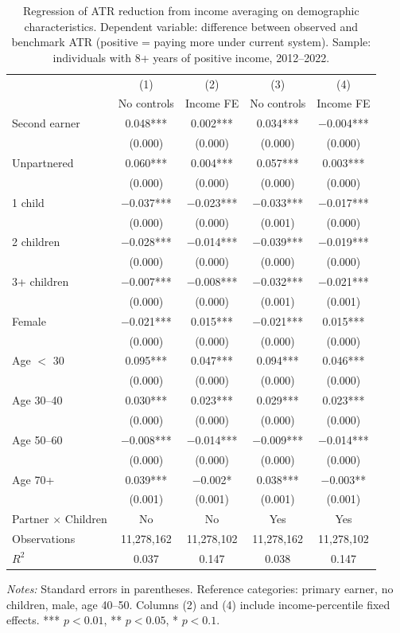 \documentclass[12pt,a4paper]{article}
\begin{document}
\begin{table}[ht]
\centering
\caption{Regression of ATR reduction from income averaging on demographic characteristics. Dependent variable: difference between observed and benchmark ATR (positive = paying more under current system). Sample: individuals with 8+ years of positive income, 2012--2022.}
\label{tab:regression}
\small
\begin{tabular}{lcccc}
\toprule
& (1) & (2) & (3) & (4) \\
& No controls & Income FE & No controls & Income FE \\
\midrule
Second earner & 0.048*** & 0.002*** & 0.034*** & $-$0.004*** \\
& (0.000) & (0.000) & (0.000) & (0.000) \\
Unpartnered & 0.060*** & 0.004*** & 0.057*** & 0.003*** \\
& (0.000) & (0.000) & (0.000) & (0.000) \\
1 child & $-$0.037*** & $-$0.023*** & $-$0.033*** & $-$0.017*** \\
& (0.000) & (0.000) & (0.001) & (0.000) \\
2 children & $-$0.028*** & $-$0.014*** & $-$0.039*** & $-$0.019*** \\
& (0.000) & (0.000) & (0.000) & (0.000) \\
3+ children & $-$0.007*** & $-$0.008*** & $-$0.032*** & $-$0.021*** \\
& (0.000) & (0.000) & (0.001) & (0.001) \\
Female & $-$0.021*** & 0.015*** & $-$0.021*** & 0.015*** \\
& (0.000) & (0.000) & (0.000) & (0.000) \\
Age $<$ 30 & 0.095*** & 0.047*** & 0.094*** & 0.046*** \\
& (0.000) & (0.000) & (0.000) & (0.000) \\
Age 30--40 & 0.030*** & 0.023*** & 0.029*** & 0.023*** \\
& (0.000) & (0.000) & (0.000) & (0.000) \\
Age 50--60 & $-$0.008*** & $-$0.014*** & $-$0.009*** & $-$0.014*** \\
& (0.000) & (0.000) & (0.000) & (0.000) \\
Age 70+ & 0.039*** & $-$0.002* & 0.038*** & $-$0.003** \\
& (0.001) & (0.001) & (0.001) & (0.001) \\
\midrule
Partner $\times$ Children & No & No & Yes & Yes \\
Observations & 11,278,162 & 11,278,102 & 11,278,162 & 11,278,102 \\
$R^2$ & 0.037 & 0.147 & 0.038 & 0.147 \\
\bottomrule
\end{tabular}
\begin{minipage}{0.9\textwidth}
\vspace{0.3em}
\footnotesize \textit{Notes:} Standard errors in parentheses. Reference categories: primary earner, no children, male, age 40--50. Columns (2) and (4) include income-percentile fixed effects. *** $p<0.01$, ** $p<0.05$, * $p<0.1$.
\end{minipage}
\end{table}

\newpage


\end{document}
